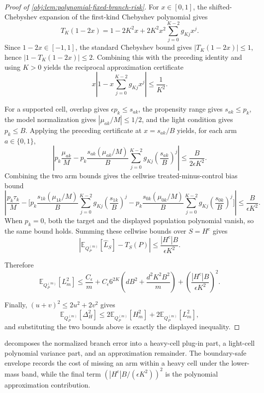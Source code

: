 \documentclass[11pt]{article}
\begin{document}
\begin{proof}[Proof of \cref{obj:lem:polynomial-fixed-branch-risk}]
For \(x\in[0,1]\), the shifted-Chebyshev expansion of the first-kind Chebyshev polynomial gives
\[
T_K(1-2x)
=
1-2K^2x
+2K^2x^2\sum_{j=0}^{K-2}g_{Kj}x^j .
\]
Since \(1-2x\in[-1,1]\), the standard Chebyshev bound gives \(|T_K(1-2x)|\le1\), hence \(|1-T_K(1-2x)|\le2\).  Combining this with the preceding identity and using \(K>0\) yields the reciprocal approximation certificate
\[
x\left|1-x\sum_{j=0}^{K-2}g_{Kj}x^j\right|
\le \frac1{K^2}.
\]

For a supported cell, overlap gives \(\epsilon p_k\le s_{ak}\), the propensity range gives \(s_{ak}\le p_k\), the model normalization gives \(|\mu_{ak}/M|\le1/2\), and the light condition gives \(p_k\le B\). Applying the preceding certificate at \(x=s_{ak}/B\) yields, for each arm \(a\in\{0,1\}\),
\[
\left|
 p_k\frac{\mu_{ak}}{M}
-
 p_k\frac{s_{ak}(\mu_{ak}/M)}{B}
 \sum_{j=0}^{K-2}g_{Kj}\left(\frac{s_{ak}}{B}\right)^j
\right|
\le
\frac{B}{2\epsilon K^2}.
\]
Combining the two arm bounds gives the cellwise treated-minus-control bias bound
\[
\left|
\frac{p_k\tau_k}{M}
-
\Bigg[
 p_k\frac{s_{1k}(\mu_{1k}/M)}{B}
 \sum_{j=0}^{K-2}g_{Kj}\left(\frac{s_{1k}}{B}\right)^j
-
 p_k\frac{s_{0k}(\mu_{0k}/M)}{B}
 \sum_{j=0}^{K-2}g_{Kj}\left(\frac{s_{0k}}{B}\right)^j
\Bigg]
\right|
\le
\frac{B}{\epsilon K^2}.
\]
When \(p_k=0\), both the target and the displayed population polynomial vanish, so the same bound holds. Summing these cellwise bounds over \(S=H^{\mathrm c}\) gives
\[
\left|
\mathbb E_{Q_P^{(m)}}[\widehat L_S]-T_S(P)
\right|
\le
\frac{|H^{\mathrm c}|B}{\epsilon K^2}.
\]

Therefore
\[
\mathbb E_{Q_P^{(m)}}[L_m^2]
\le
\frac{C_\epsilon}{m}
+
C_\epsilon6^{2K}
\left(dB^2+\frac{d^2K^2B^2}{m}\right)
+
\left(\frac{|H^{\mathrm c}|B}{\epsilon K^2}\right)^2 .
\]

Finally, \((u+v)^2\le2u^2+2v^2\) gives
\[
\mathbb E_{Q_P^{(m)}}[\Delta_H^2]
\le
2\mathbb E_{Q_P^{(m)}}[H_m^2]
+
2\mathbb E_{Q_P^{(m)}}[L_m^2],
\]
and substituting the two bounds above is exactly the displayed inequality. %
\end{proof}

 decomposes the normalized branch error into a heavy-cell plug-in part, a light-cell polynomial variance part, and an approximation remainder. The boundary-safe envelope records the cost of missing an arm within a heavy cell under the lower-mass band, while the final term \((|H^{\mathrm c}|B/(\epsilon K^2))^2\) is the polynomial approximation contribution.
\end{document}
